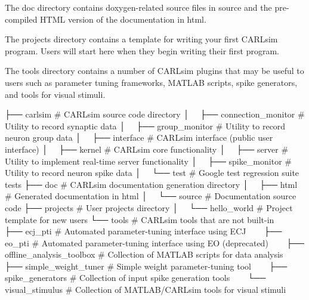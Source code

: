 The {\ttfamily doc} directory contains doxygen-\/related source files in {\ttfamily source} and the pre-\/compiled H\+T\+ML version of the documentation in {\ttfamily html}.

The {\ttfamily projects} directory contains a template for writing your first C\+A\+R\+Lsim program. Users will start here when they begin writing their first program.

The {\ttfamily tools} directory contains a number of C\+A\+R\+Lsim plugins that may be useful to users such as parameter tuning frameworks, M\+A\+T\+L\+AB scripts, spike generators, and tools for visual stimuli.


\begin{DoxyCode}
├── carlsim                       # CARLsim source code directory
│   ├── connection\_monitor          # Utility to record synaptic data
│   ├── group\_monitor               # Utility to record neuron group data
│   ├── \textcolor{keyword}{interface                   }# CARLsim interface (public user interface)
│   ├── kernel                      # CARLsim core functionality
│   ├── server                      # Utility to implement real-time server functionality
│   ├── spike\_monitor               # Utility to record neuron spike data
│   └── test                        # Google test regression suite tests
├── doc                           # CARLsim documentation generation directory
│   ├── html                        # Generated documentation in html
│   └── source                      # Documentation source code
├── projects                      # User projects directory
│   └── hello\_world                 # Project template for new users
└── tools                         # CARLsim tools that are not built-in
    ├── ecj\_pti                     # Automated parameter-tuning interface using ECJ
    ├── eo\_pti                      # Automated parameter-tuning interface using EO (deprecated)
    ├── offline\_analysis\_toolbox    # Collection of MATLAB scripts for data analysis
    ├── simple\_weight\_tuner         # Simple weight parameter-tuning tool
    ├── spike\_generators            # Collection of input spike generation tools
    └── visual\_stimulus             # Collection of MATLAB/CARLsim tools for visual stimuli
\end{DoxyCode}


